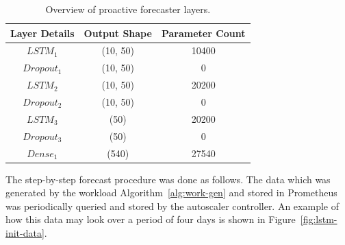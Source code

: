 \begin{table}
    \caption{Overview of proactive forecaster layers.}\label{tab:lstm-layers}
    \centering
    \begin{tabular}{ccc}
        \toprule
        \textbf{Layer Details} & \textbf{Output Shape} & \textbf{Parameter Count}\\
        \midrule
        $LSTM_{1}$ & (10, 50) & 10400\\
        $Dropout_{1}$ & (10, 50) & 0\\
        $LSTM_{2}$ & (10, 50) & 20200\\
        $Dropout_{2}$ & (10, 50) & 0\\
        $LSTM_{3}$ & (50) & 20200\\
        $Dropout_{3}$ & (50) & 0\\
        $Dense_{1}$ & (540) & 27540\\
        \toprule
    \end{tabular}
\end{table}

The step-by-step forecast procedure was done as follows. The data which was generated by the workload Algorithm~\ref{alg:work-gen} and stored in Prometheus was periodically queried and stored by the autoscaler controller. An example of how this data may look over a period of four days is shown in Figure~\ref{fig:lstm-init-data}.

\begin{center}
\begin{minipage}{\linewidth}
    \label{fig:lstm-init-data}
\end{minipage}
\end{center}

